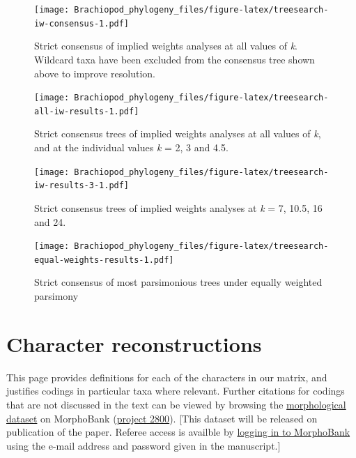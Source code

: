 \documentclass[openany]{book}
\begin{document}
\begin{figure}
\centering
\texttt{[image: Brachiopod\_phylogeny\_files/figure-latex/treesearch-iw-consensus-1.pdf]}
\caption{\label{fig:treesearch-iw-consensus}Strict consensus of implied weights analyses at all
values of \emph{k}. Wildcard taxa have been excluded from the consensus
tree shown above to improve resolution.}
\end{figure}








\clearpage 

\begin{figure}
\centering
\texttt{[image: Brachiopod\_phylogeny\_files/figure-latex/treesearch-all-iw-results-1.pdf]}
\caption{\label{fig:treesearch-all-iw-results}Strict consensus trees of implied weights analyses
at all values of \emph{k}, and at the individual
values \emph{k} = 2, 3 and 4.5.}
\end{figure}

\clearpage 

\begin{figure}
\centering
\texttt{[image: Brachiopod\_phylogeny\_files/figure-latex/treesearch-iw-results-3-1.pdf]}
\caption{\label{fig:treesearch-iw-results-3}Strict consensus trees of implied weights analyses
at \emph{k} = 7, 10.5, 16 and 24.}
\end{figure}

\clearpage

\begin{figure}
\centering
\texttt{[image: Brachiopod\_phylogeny\_files/figure-latex/treesearch-equal-weights-results-1.pdf]}
\caption{\label{fig:treesearch-equal-weights-results}Strict consensus of
most parsimonious trees under equally weighted parsimony}
\end{figure}

\clearpage

\hypertarget{reconstructions}{\chapter{Character
reconstructions}\label{reconstructions}}

This page provides definitions for each of the characters in our matrix,
and justifies codings in particular taxa where relevant. Further
citations for codings that are not discussed in the text can be viewed
by browsing the \protect\hyperlink{dataset}{morphological dataset} on
MorphoBank (\href{https://morphobank.org/permalink/?P2800}{project
2800}). {[}This dataset will be released on publication of the paper.
Referee access is availble by
\href{https://morphobank.org/index.php/LoginReg/form}{logging in to
MorphoBank} using the e-mail address and password given in the
manuscript.{]}
\end{document}
